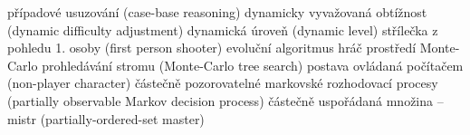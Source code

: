 \abbrv[CBR]   případové usuzování (case-base reasoning)
\abbrv[DDA]  dynamicky vyvažovaná obtížnost (dynamic difficulty adjustment)
\abbrv[DL]   dynamická úroveň (dynamic level)
\abbrv[FPS]   střílečka z pohledu 1. osoby (first person shooter)
\abbrv[EA]   evoluční algoritmus
\abbrv[HP]   hráč prostředí
\abbrv[MCTS] Monte-Carlo prohledávání stromu (Monte-Carlo tree search)
\abbrv[NPC]		 postava ovládaná počítačem (non-player character)
\abbrv[POMDP] částečně pozorovatelné markovské rozhodovací procesy (partially observable Markov decision process)
\abbrv[POSM]  částečně uspořádaná množina – mistr (partially-ordered-set master)

\stopAbbreviations

\endinput
